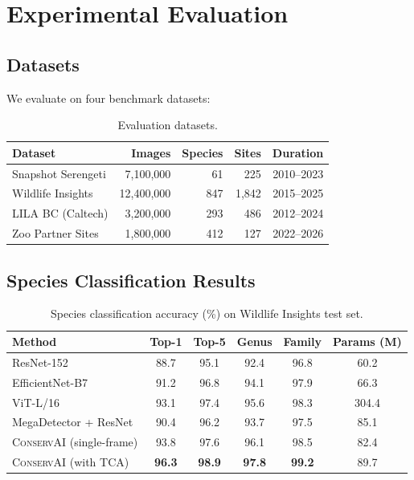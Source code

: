 \documentclass[11pt,letterpaper]{article}
\newcommand{\ConservAI}{\textsc{ConservAI}}
\begin{document}
\section{Experimental Evaluation}

\subsection{Datasets}

We evaluate on four benchmark datasets:

\begin{table}[htbp]
\centering
\caption{Evaluation datasets.}
\label{tab:datasets}
\begin{tabular}{lrrrr}
\toprule
\textbf{Dataset} & \textbf{Images} & \textbf{Species} & \textbf{Sites} & \textbf{Duration} \\
\midrule
Snapshot Serengeti & 7,100,000 & 61 & 225 & 2010--2023 \\
Wildlife Insights & 12,400,000 & 847 & 1,842 & 2015--2025 \\
LILA BC (Caltech) & 3,200,000 & 293 & 486 & 2012--2024 \\
Zoo Partner Sites & 1,800,000 & 412 & 127 & 2022--2026 \\
\bottomrule
\end{tabular}
\end{table}

\subsection{Species Classification Results}

\begin{table}[htbp]
\centering
\caption{Species classification accuracy (\%) on Wildlife Insights test set.}
\label{tab:classification}
\begin{tabular}{lccccc}
\toprule
\textbf{Method} & \textbf{Top-1} & \textbf{Top-5} & \textbf{Genus} & \textbf{Family} & \textbf{Params (M)} \\
\midrule
ResNet-152~\cite{norouzzadeh2018} & 88.7 & 95.1 & 92.4 & 96.8 & 60.2 \\
EfficientNet-B7~\cite{tan2019} & 91.2 & 96.8 & 94.1 & 97.9 & 66.3 \\
ViT-L/16~\cite{dosovitskiy2021} & 93.1 & 97.4 & 95.6 & 98.3 & 304.4 \\
MegaDetector + ResNet~\cite{beery2019mega} & 90.4 & 96.2 & 93.7 & 97.5 & 85.1 \\
\midrule
\ConservAI{} (single-frame) & 93.8 & 97.6 & 96.1 & 98.5 & 82.4 \\
\ConservAI{} (with TCA) & \textbf{96.3} & \textbf{98.9} & \textbf{97.8} & \textbf{99.2} & 89.7 \\
\bottomrule
\end{tabular}
\end{table}
\end{document}
